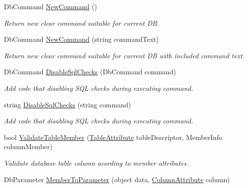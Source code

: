 \begin{DoxyCompactItemize}
Db\+Command \mbox{\hyperlink{class_uniform_data_operator_1_1_sql_1_1_my_sql_1_1_my_sql_data_operator_af5850bfb38f7dfcd5acd5157458ef4bd}{New\+Command}} ()
\begin{DoxyCompactList}\small\item\em Return new clear command suitable for current DB. \end{DoxyCompactList}\item 
Db\+Command \mbox{\hyperlink{class_uniform_data_operator_1_1_sql_1_1_my_sql_1_1_my_sql_data_operator_a6c2e2d374072c275953a515379963881}{New\+Command}} (string command\+Text)
\begin{DoxyCompactList}\small\item\em Return new clear command suitable for current DB with included command text. \end{DoxyCompactList}\item 
Db\+Command \mbox{\hyperlink{class_uniform_data_operator_1_1_sql_1_1_my_sql_1_1_my_sql_data_operator_affbacb4fb1773fc14cdbb9cbcd315c5f}{Disable\+Sql\+Checks}} (Db\+Command command)
\begin{DoxyCompactList}\small\item\em Add code that disabling S\+QL checks during executing command. \end{DoxyCompactList}\item 
string \mbox{\hyperlink{class_uniform_data_operator_1_1_sql_1_1_my_sql_1_1_my_sql_data_operator_a3e80f9136c9fef46a443901a15f1e289}{Disable\+Sql\+Checks}} (string command)
\begin{DoxyCompactList}\small\item\em Add code that disabling S\+QL checks during executing command. \end{DoxyCompactList}\item 
bool \mbox{\hyperlink{class_uniform_data_operator_1_1_sql_1_1_my_sql_1_1_my_sql_data_operator_a3c1a7ceec19175ba5bbce8109565be05}{Validate\+Table\+Member}} (\mbox{\hyperlink{class_uniform_data_operator_1_1_sql_1_1_markup_1_1_table_attribute}{Table\+Attribute}} table\+Descriptor, Member\+Info column\+Member)
\begin{DoxyCompactList}\small\item\em Validate database table column acording to member attributes. \end{DoxyCompactList}\item 
Db\+Parameter \mbox{\hyperlink{class_uniform_data_operator_1_1_sql_1_1_my_sql_1_1_my_sql_data_operator_a4f878911e378a4ece16d93f4c3352234}{Member\+To\+Parameter}} (object data, \mbox{\hyperlink{class_uniform_data_operator_1_1_sql_1_1_markup_1_1_column_attribute}{Column\+Attribute}} column)

\end{DoxyCompactItemize}
